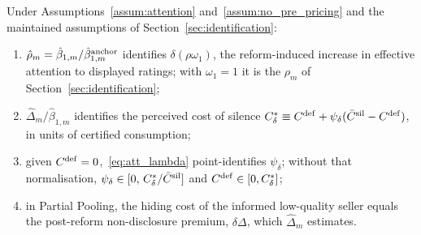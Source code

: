 \label{prop:att_identification}
Under Assumptions~\ref{assum:attention} and~\ref{assum:no_pre_pricing} and the maintained assumptions of Section~\ref{sec:identification}:
\begin{enumerate}[label=(\roman*)]
    \item $\hat\rho_m=\hat\beta_{1,m}/\hat\beta^{\rm anchor}_{1,m}$ identifies $\delta(\rho\omega_1)$, the reform-induced increase in effective attention to displayed ratings; with $\omega_1=1$ it is the $\rho_m$ of Section~\ref{sec:identification};
    \item $\hat\Delta_m/\hat\beta_{1,m}$ identifies the perceived cost of silence $C^*_\delta\equiv C^{\rm def}+\psi_\delta(\bar C^{\rm sil}-C^{\rm def})$, in units of certified consumption;
    \item given $C^{\rm def}=0$,~\eqref{eq:att_lambda} point-identifies $\psi_\delta$; without that normalisation, $\psi_\delta\in[0,\,C^*_\delta/\bar C^{\rm sil}]$ and $C^{\rm def}\in[0,C^*_\delta]$;
    \item in Partial Pooling, the hiding cost of the informed low-quality seller equals the post-reform non-disclosure premium, $\delta\Delta$, which $\hat\Delta_m$ estimates.
\end{enumerate}
